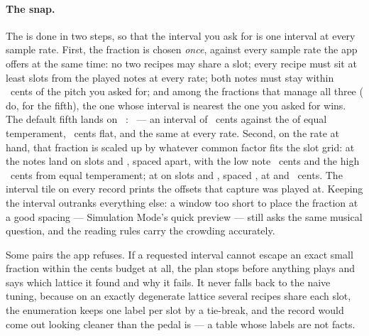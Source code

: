 \documentclass[11pt,a4paper]{article}
\begin{document}
\paragraph{The snap.} The  is done in two steps, so
that the interval you ask for is one interval at every sample rate.
First, the fraction is chosen \emph{once}, against every sample rate the
app offers at the same time: no two recipes may share a slot; every recipe
must sit at least \imdResolvableSpacing{} slots from the played notes at
every rate; both notes must stay within \imdCentsBudget{}~cents of the
pitch you asked for; and among the fractions that manage all three
(\imdSurvivorCount{} do, for the fifth), the one whose interval is nearest
the one you asked for wins. The default fifth lands on
\imdRatioA{}~:~\imdRatioB{} --- an interval of
\imdStandardIntervalCents{}~cents against the \imdRequestedIntervalCents{}
of equal temperament, \imdIntervalFlatCents{}~cents flat, and the same at
every rate. Second, on the rate at hand, that fraction is scaled up by
whatever common factor fits the slot grid: at \imdClassARates{} the
notes land on slots \imdClassABinOne{} and \imdClassABinTwo{}, spaced
\imdClassASpacing{} apart, with the low note \imdClassACentsOne{}~cents
and the high \imdClassACentsTwo{}~cents from equal temperament; at
\imdClassBRates{} on slots \imdClassBBinOne{} and \imdClassBBinTwo{},
spaced \imdClassBSpacing{}, at \imdClassBCentsOne{} and
\imdClassBCentsTwo{}~cents. The interval tile on every record prints the
offsets that capture was played at. Keeping the interval outranks
everything else: a window too short to place the fraction at a good
spacing --- Simulation Mode's quick preview --- still asks the same
musical question, and the reading rules carry the crowding accurately.

Some pairs the app refuses. If a requested interval cannot escape an exact
small fraction within the cents budget at all, the plan stops before
anything plays and says which lattice it found and why it fails. It never
falls back to the naive tuning, because on an exactly degenerate lattice
several recipes share each slot, the enumeration keeps one label per slot
by a tie-break, and the record would come out looking cleaner than the
pedal is --- a table whose labels are not facts.
\end{document}
